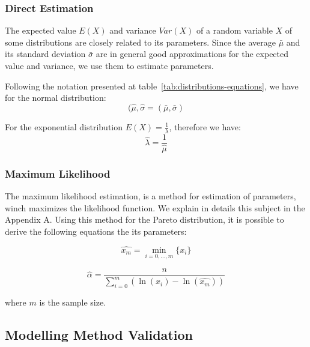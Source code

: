 \subsubsection{Direct Estimation}

The expected value $E(X)$ and variance $Var(X)$ of a random variable $X$ of some distributions are closely related to its parameters. Since the average $\bar{\mu}$ and its standard deviation $\bar{\sigma}$ are in general good approximations for the expected value and variance, we use them to estimate parameters.

Following the notation presented at table~\ref{tab:distributions-equations}, we have for the normal distribution:
\begin{equation}
(\hat{\mu}, \hat{\sigma} = (\bar{\mu}, \bar{\sigma})
\end{equation}

For the exponential distribution $E(X) = \frac{1}{\lambda}$, therefore we have:
\begin{equation}
\hat{\lambda} = \frac{1}{\hat{\mu}}
\end{equation} 

\subsubsection{Maximum Likelihood}


The maximum likelihood estimation, is a method for estimation of parameters, winch maximizes the likelihood function. We explain in details this subject in the Appendix A. Using this method for the Pareto distribution, it is possible to derive the following equations the its parameters:

\begin{equation}
\hat{x_{m}} = \min_{i = 0, ..., m}\{x_{i}\}
\end{equation} 

\begin{equation}
\hat{\alpha} = \frac{n}{ \sum_{i = 0}^{m}(\ln{(x_{i}) - \ln(\hat{x_{m}})})  }
\end{equation} 

where $m$ is the sample size.




\subsection{Modelling Method Validation}

